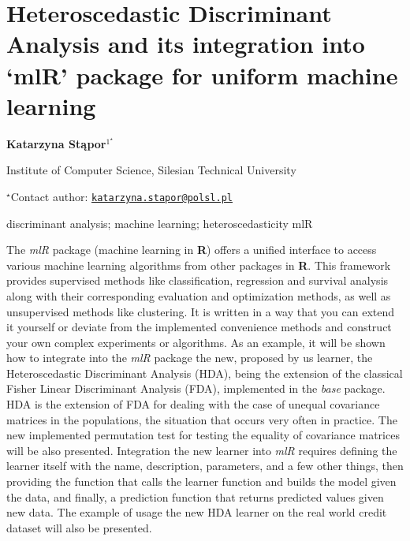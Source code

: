 \documentclass[\main/boa.tex]{subfiles}
\begin{document}
\pagestyle{empty}

\section{Heteroscedastic Discriminant Analysis and its integration into `mlR'
package for uniform machine learning}

\begin{center}
  {\bf Katarzyna Stąpor$^{1^\star}$}
\end{center}

\vskip 0.3cm

\begin{affiliations}
\begin{enumerate}
\begin{minipage}{0.915\textwidth}
\centering
\item Institute of Computer Science, Silesian Technical University \\[-2pt]
\end{minipage}
\end{enumerate}
$^\star$Contact author: \href{mailto:katarzyna.stapor@polsl.pl}{\nolinkurl{katarzyna.stapor@polsl.pl}}\\
\end{affiliations}

\vskip 0.5cm

\begin{minipage}{0.915\textwidth}
\keywords discriminant analysis; machine learning; heteroscedasticity
\packages mlR
\end{minipage}

\vskip 0.8cm

The \emph{mlR} package (machine learning in \textbf{R}) offers a unified
interface to access various machine learning algorithms from other
packages in \textbf{R}. This framework provides supervised methods like
classification, regression and survival analysis along with their
corresponding evaluation and optimization methods, as well as
unsupervised methods like clustering. It is written in a way that you
can extend it yourself or deviate from the implemented convenience
methods and construct your own complex experiments or algorithms. As an
example, it will be shown how to integrate into the \emph{mlR} package
the new, proposed by us learner, the Heteroscedastic Discriminant
Analysis (HDA), being the extension of the classical Fisher Linear
Discriminant Analysis (FDA), implemented in the \emph{base} package. HDA
is the extension of FDA for dealing with the case of unequal covariance
matrices in the populations, the situation that occurs very often in
practice. The new implemented permutation test for testing the equality
of covariance matrices will be also presented. Integration the new
learner into \emph{mlR} requires defining the learner itself with the
name, description, parameters, and a few other things, then providing
the function that calls the learner function and builds the model given
the data, and finally, a prediction function that returns predicted
values given new data. The example of usage the new HDA learner on the
real world credit dataset will also be presented.
\end{document}
